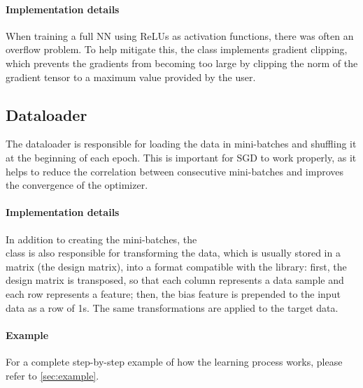 \paragraph{Implementation details} When training a full \ac{NN} using ReLUs as activation functions, there was often an overflow problem. To help mitigate this, the  class implements gradient clipping, which prevents the gradients from becoming too large by clipping the norm of the gradient tensor to a maximum value provided by the user.

\subsection{Dataloader} \label{sec:dataloader}
The dataloader is responsible for loading the data in mini-batches and shuffling it at the beginning of each epoch. This is important for \ac{SGD} to work properly, as it helps to reduce the correlation between consecutive mini-batches and improves the convergence of the optimizer.

\paragraph{Implementation details} In addition to creating the mini-batches, the\\ class is also responsible for transforming the data, which is usually stored in a  matrix (the design matrix), into a format compatible with the \mfnet library: first, the design matrix is transposed, so that each column represents a data sample and each row represents a feature; then, the bias feature is prepended to the input data as a row of 1s. The same transformations are applied to the target data.

\paragraph{Example}
For a complete step-by-step example of how the learning process works, please refer to \cref{sec:example}.
